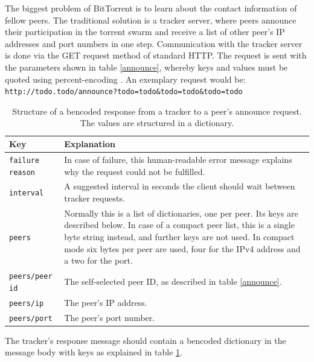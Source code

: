 \documentclass[10pt, a4paper, twoside, headsepline]{scrbook}
\renewcommand{\_}{\origunderscore\allowbreak}
\begin{document}
The biggest problem of BitTorrent is to learn about the contact information of fellow peers. The traditional solution is a tracker server, where peers announce their participation in the torrent swarm and receive a list of other peer's IP addresses and port numbers in one step. Communication with the tracker server is done via the GET request method of standard HTTP. The request is sent with the parameters shown in table \ref{announce}, whereby keys and values must be quoted using percent-encoding \cite[§~2.1]{percent}. An exemplary request would be: \nolinkurl{http://todo.todo/announce?todo=todo&todo=todo&todo=todo}

\begin{table}
\centering
\begin{tabularx}{\textwidth}{lX}
\toprule
Key & Explanation \\
\midrule
\texttt{failure reason} & In case of failure, this human-readable error message explains why the request could not be fulfilled. \\
\texttt{interval} & A suggested interval in seconds the client should wait between tracker requests. \\
\texttt{peers} & Normally this is a list of dictionaries, one per peer. Its keys are described below. In case of a compact peer list, this is a single byte string instead, and further keys are not used. In compact mode six bytes per peer are used, four for the IPv4 address and a two for the port. \\
\texttt{peers/peer id} & The self-selected peer ID, as described in table \ref{announce}. \\
\texttt{peers/ip} & The peer's IP address. \\
\texttt{peers/port} & The peer's port number. \\
\bottomrule
\end{tabularx}
\caption[A tracker's response to an announce request]{Structure of a bencoded response from a tracker to a peer's announce request. The values are structured in a dictionary.}
\label{announce-response}
\end{table}

The tracker's response message should contain a bencoded dictionary in the message body with keys as explained in table \ref{announce-response}.
\end{document}
